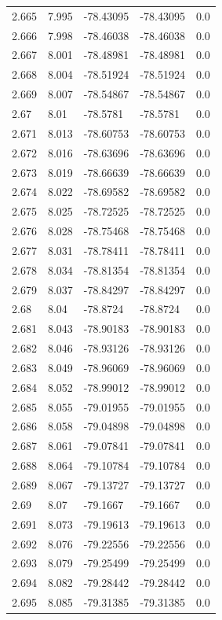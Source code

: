 \begin{tabular}{lllll}
2.665 & 7.995 & -78.43095 & -78.43095 & 0.0 \\
2.666 & 7.998 & -78.46038 & -78.46038 & 0.0 \\
2.667 & 8.001 & -78.48981 & -78.48981 & 0.0 \\
2.668 & 8.004 & -78.51924 & -78.51924 & 0.0 \\
2.669 & 8.007 & -78.54867 & -78.54867 & 0.0 \\
2.67 & 8.01 & -78.5781 & -78.5781 & 0.0 \\
2.671 & 8.013 & -78.60753 & -78.60753 & 0.0 \\
2.672 & 8.016 & -78.63696 & -78.63696 & 0.0 \\
2.673 & 8.019 & -78.66639 & -78.66639 & 0.0 \\
2.674 & 8.022 & -78.69582 & -78.69582 & 0.0 \\
2.675 & 8.025 & -78.72525 & -78.72525 & 0.0 \\
2.676 & 8.028 & -78.75468 & -78.75468 & 0.0 \\
2.677 & 8.031 & -78.78411 & -78.78411 & 0.0 \\
2.678 & 8.034 & -78.81354 & -78.81354 & 0.0 \\
2.679 & 8.037 & -78.84297 & -78.84297 & 0.0 \\
2.68 & 8.04 & -78.8724 & -78.8724 & 0.0 \\
2.681 & 8.043 & -78.90183 & -78.90183 & 0.0 \\
2.682 & 8.046 & -78.93126 & -78.93126 & 0.0 \\
2.683 & 8.049 & -78.96069 & -78.96069 & 0.0 \\
2.684 & 8.052 & -78.99012 & -78.99012 & 0.0 \\
2.685 & 8.055 & -79.01955 & -79.01955 & 0.0 \\
2.686 & 8.058 & -79.04898 & -79.04898 & 0.0 \\
2.687 & 8.061 & -79.07841 & -79.07841 & 0.0 \\
2.688 & 8.064 & -79.10784 & -79.10784 & 0.0 \\
2.689 & 8.067 & -79.13727 & -79.13727 & 0.0 \\
2.69 & 8.07 & -79.1667 & -79.1667 & 0.0 \\
2.691 & 8.073 & -79.19613 & -79.19613 & 0.0 \\
2.692 & 8.076 & -79.22556 & -79.22556 & 0.0 \\
2.693 & 8.079 & -79.25499 & -79.25499 & 0.0 \\
2.694 & 8.082 & -79.28442 & -79.28442 & 0.0 \\
2.695 & 8.085 & -79.31385 & -79.31385 & 0.0 \\

\end{tabular}
